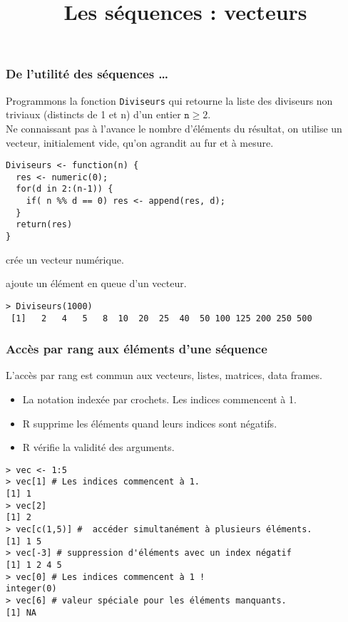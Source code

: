 \documentclass[10pt]{beamer}
\title{Les séquences : vecteurs}
\begin{document}
\maketitle




\begin{frame}[fragile]
  \frametitle{De l’utilité des séquences \dots}
  Programmons la fonction \texttt{Diviseurs} qui retourne la liste des diviseurs non triviaux (distincts de 1 et n) d'un entier $\mathtt{n} \geq 2$. \\
  Ne connaissant pas à l'avance le nombre d'éléments du résultat, on utilise un vecteur, initialement vide, qu'on agrandit au fur et à mesure.
  \begin{lstlisting}[style=editor]
Diviseurs <- function(n) {
  res <- numeric(0);
  for(d in 2:(n-1)) {
    if( n %% d == 0) res <- append(res, d);
  }
  return(res)
}
\end{lstlisting}

\begin{description}
\item[\texttt{numeric}] crée un vecteur numérique.
\item[\texttt{append}] ajoute un élément en queue d'un vecteur.
\end{description}
\begin{lstlisting}
> Diviseurs(1000)
 [1]   2   4   5   8  10  20  25  40  50 100 125 200 250 500
\end{lstlisting}
\end{frame}

\begin{frame}[fragile]
  \frametitle{Accès par rang aux éléments d'une séquence}
  L'accès par rang est commun aux vecteurs, listes, matrices, data frames.\\
  \begin{itemize}
  \item \alert{La notation indexée par crochets. Les indices commencent à 1.}
  \item R supprime les éléments quand leurs indices sont négatifs.
  \item R vérifie la validité des arguments.
  \end{itemize}


  \begin{lstlisting}
> vec <- 1:5
> vec[1] # Les indices commencent à 1.
[1] 1
> vec[2]
[1] 2
> vec[c(1,5)] #  accéder simultanément à plusieurs éléments.
[1] 1 5
> vec[-3] # suppression d'éléments avec un index négatif
[1] 1 2 4 5
> vec[0] # Les indices commencent à 1 !
integer(0)
> vec[6] # valeur spéciale pour les éléments manquants.
[1] NA
\end{lstlisting}
\end{frame}
\end{document}
